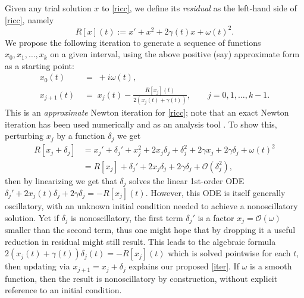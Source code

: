 \documentclass[10pt]{article}
\newcommand{\be}{\begin{equation}}
\newcommand{\ee}{\end{equation}}
\newcommand{\bigO}{{\mathcal O}}
\newcommand{\om}{\omega}
\newcommand{\g}{\gamma}
\newcommand{\Fruzsi}[1]{{\color{blue}#1}}
\begin{document}
Given any trial solution $x$ to \cref{ricc}, we define its {\em residual}
as the left-hand side of \cref{ricc}, namely
\be
\label{R}
R[x](t) := x' + x^2 + 2\g(t)x + \om(t)^2.
\ee
We propose the following iteration
to generate a sequence of functions $x_0, x_1, \dots, x_k$
on a given interval,
using the above positive (say) approximate form as a starting point:
\begin{align}
x_0(t) &\;=\; +i\om(t),
\label{init}
\\
    x_{j+1}(t) &\;=\; x_j(t) - \frac{R[x_j](t)}{2 \left( x_j(t) + \g(t) \right)}, \qquad j=0,1,\dots,k-1.
\label{iter}
\end{align}
This is an {\em approximate} Newton
iteration for \eqref{ricc}; note that an exact Newton iteration has
been used numerically \cite{krivec2008,krivec2014}
and as an analysis tool \cite{heitman2015}.
To show this, perturbing $x_j$ by a function $\delta_j$ we get
\begin{align}
    R[x_j + \delta_j] &= x_j' + \delta_j' + x_j^2 + 2 x_j \delta_j + \delta_j^2 
    + 2\g x_j + 2\g\delta_j + \om(t)^2 \nonumber \\
    &= R[x_j] + \delta_j' + 2x_j\delta_j + 2\g\delta_j + \bigO(\delta_j^2), \nonumber
\end{align}
then by linearizing we get that $\delta_j$ solves the linear 1st-order ODE
$\delta_j' + 2x_j(t) \delta_j + 2\g \delta_j  = -R[x_j](t)$.
However, this ODE is itself generally oscillatory,
with an unknown initial condition needed to achieve a nonoscillatory
solution.
Yet if $\delta_j$ is nonoscillatory, the first term $\delta_j'$ is
a factor $x_j = \bigO(\om)$ smaller than the second term, thus
one might hope that by dropping it a useful reduction in residual might
still result.
This leads to the algebraic formula $2\left(x_j(t) + \g(t)\right) \delta_j(t) = -R[x_j](t)$
which is solved pointwise for each $t$, then updating via
$x_{j+1} = x_j + \delta_j$ explains our proposed \cref{iter}.
If $\om$ is a smooth function, then
the result is nonoscillatory by construction, without explicit reference
to an initial condition.
\end{document}
